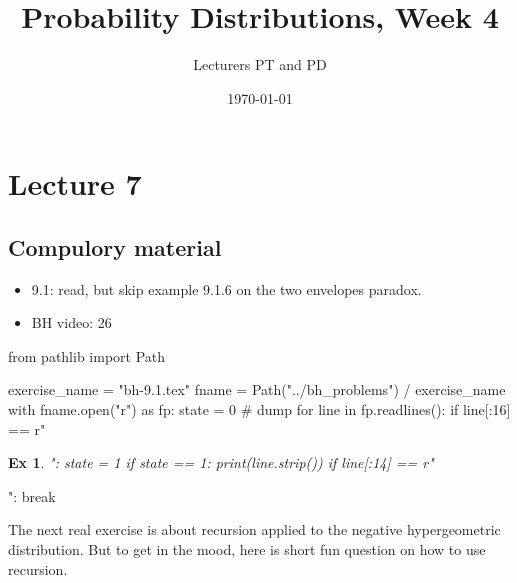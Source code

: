 \documentclass[a4paper,11pt]{article}
\author{Lecturers PT and PD
}
\date{\today}
\title{Probability Distributions, Week 4}
\newtheorem{exercise}[theorem]{Ex}
\begin{document}
\maketitle
\tableofcontents

\section{Lecture 7}
\label{sec:lecture-1}


\subsection{Compulory material}
\label{sec:compulory-material}

\begin{itemize}
\item 9.1: read, but skip example 9.1.6 on the two envelopes paradox.
\item BH video: 26
\end{itemize}

\begin{pycode}
from pathlib import Path

exercise_name = "bh-9.1.tex"
fname = Path("../bh_problems") / exercise_name
with fname.open("r") as fp:
    state = 0  # dump
    for line in fp.readlines():
        if line[:16] == r"\begin{exercise}":
            state = 1
        if state == 1:
            print(line.strip())
        if line[:14] == r"\end{exercise}":
            break
\end{pycode}



The next real exercise is about recursion applied to the negative hypergeometric distribution. But to get in the mood, here is short fun question on how to use recursion.
\end{document}

